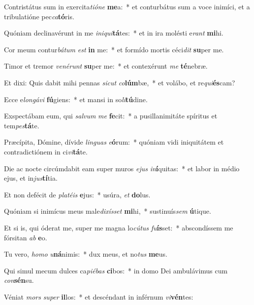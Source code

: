 \item Contristátus sum in exercita\textit{ti}\textit{ó}\textit{ne} \textbf{me}a:~* et conturbátus sum a voce inimíci, et a tribulatióne pec\textit{ca}\textbf{tó}ris.
\item Quóniam declinavérunt in me \textit{in}\textit{i}\textit{qui}\textbf{tá}tes:~* et in ira molésti e\textit{rant} \textbf{mi}hi.
\item Cor meum contur\textit{bá}\textit{tum} \textit{est} \textbf{in} me:~* et formído mortis céci\textit{dit} \textbf{su}per me.
\item Timor et tremor \textit{ve}\textit{né}\textit{runt} \textbf{su}per me:~* et contexérunt \textit{me} \textbf{té}nebræ.
\item Et dixi: Quis dabit mihi pennas \textit{sic}\textit{ut} \textit{co}\textbf{lúm}bæ,~* et volábo, et re\textit{qui}\textbf{és}cam?
\item Ecce e\textit{lon}\textit{gá}\textit{vi} \textbf{fú}giens:~* et mansi in so\textit{li}\textbf{tú}dine.
\item Exspectábam eum, qui \textit{sal}\textit{vum} \textit{me} \textbf{fe}cit:~* a pusillanimitáte spíritus et tem\textit{pes}\textbf{tá}te.
\item Præcípita, Dómine, dívide \textit{lin}\textit{guas} \textit{e}\textbf{ó}rum:~* quóniam vidi iniquitátem et contradictiónem in ci\textit{vi}\textbf{tá}te.
\item Die ac nocte circúmdabit eam super muros \textit{e}\textit{jus} \textit{in}\textbf{í}quitas:~* et labor in médio ejus, et in\textit{jus}\textbf{tí}tia.
\item Et non defécit de \textit{pla}\textit{té}\textit{is} \textbf{e}jus:~* usúra, \textit{et} \textbf{do}lus.
\item Quóniam si inimícus meus male\textit{di}\textit{xís}\textit{set} \textbf{mi}hi,~* sustinuís\textit{sem} \textbf{ú}tique.
\item Et si is, qui óderat me, super me magna lo\textit{cú}\textit{tus} \textit{fu}\textbf{ís}set:~* abscondíssem me fórsitan \textit{ab} \textbf{e}o.
\item Tu vero, \textit{ho}\textit{mo} \textit{u}\textbf{ná}nimis:~* dux meus, et no\textit{tus} \textbf{me}us.
\item Qui simul mecum dulces ca\textit{pi}\textit{é}\textit{bas} \textbf{ci}bos:~* in domo Dei ambulávimus cum \textit{con}\textbf{sén}su.
\item Véniat \textit{mors} \textit{su}\textit{per} \textbf{il}los:~* et descéndant in inférnum \textit{vi}\textbf{vén}tes:
